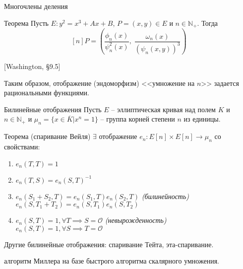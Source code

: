 \documentclass{beamer}
\begin{document}
\begin{frame}{Многочлены деления}
\begin{block}{Теорема}
    Пусть $E: {y^2} = {x^3} + Ax + B$, $P = \left( {x,y} \right) \in E$ и $n \in {\mathbb{N}_+ }$. Тогда
    \[[n] P = \left( {\frac{{{\phi _n}\left( x \right)}}{{\psi _n^2\left( x \right)}},\;\frac{{{\omega _n}\left( x \right)}}{{{{\left( {{\psi _n}\left( {x,y} \right)} \right)}^3}}}} \right)
    \]
\end{block}

\ProofBegin {} [Washington, \S9.5] \ProofEnd
\vspace{1em}

Таким образом, отображение (эндоморфизм) <<умножение на $n$>> задается рациональными функциями.
\end{frame}


\begin{frame}{Билинейные отображения}
Пусть $E$ -- эллиптическая кривая над полем $K$ и $n \in \mathbb{N}_{+}$ и $\mu_n = \{x \in \overline{K} | x^n = 1\}$ -- группа корней степени $n$ из единицы.
    
\begin{block}{Теорема (спаривание Вейля)}
$\exists$ отображение
$
e_n: E[n] \times E[n] \rightarrow \mu_n
$
со свойствами:
\begin{enumerate}
\item $e_n(T,T) = 1$
\item $e_n(T,S) = e_n(S,T)^{-1}$
\item $e_n(S_1 + S_2, T) = e_n(S_1, T) e_n(S_2, T)$ \hfill \textit{(билинейность)} \\
$e_n(S, T_1 + T_2) = e_n(S, T_1) e_n(S, T_2)$
\item $e_n(S,T) = 1, \forall T \implies S = \mathcal{O}$ \hfill \textit{(невырожденность)}\\
$e_n(S,T) = 1, \forall S \implies T = \mathcal{O}$
\end{enumerate}
\end{block}

Другие билинейные отображения: спаривание Тейта, эта-спаривание.

\vspace{1em}
 алгоритм Миллера на базе быстрого алгоритма скалярного умножения.

\end{frame}
\end{document}
